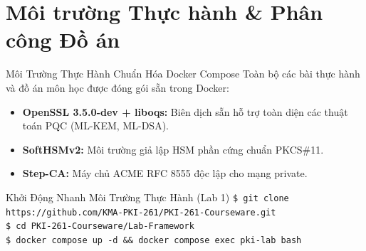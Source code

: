 \section{Môi trường Thực hành \& Phân công Đồ án}

\begin{frame}{Môi Trường Thực Hành Chuẩn Hóa Docker Compose}
  Toàn bộ các bài thực hành và đồ án môn học được đóng gói sẵn trong Docker:
  \begin{itemize}\small
    \item \textbf{OpenSSL 3.5.0-dev + liboqs:} Biên dịch sẵn hỗ trợ toàn diện các thuật toán PQC (ML-KEM, ML-DSA).
    \item \textbf{SoftHSMv2:} Môi trường giả lập HSM phần cứng chuẩn PKCS\#11.
    \item \textbf{Step-CA:} Máy chủ ACME RFC 8555 độc lập cho mạng private.
  \end{itemize}

  \begin{block}{Khởi Động Nhanh Môi Trường Thực Hành (Lab 1)}
    \texttt{\$ git clone https://github.com/KMA-PKI-261/PKI-261-Courseware.git}\\
    \texttt{\$ cd PKI-261-Courseware/Lab-Framework}\\
    \texttt{\$ docker compose up -d \&\& docker compose exec pki-lab bash}
  \end{block}
\end{frame}

